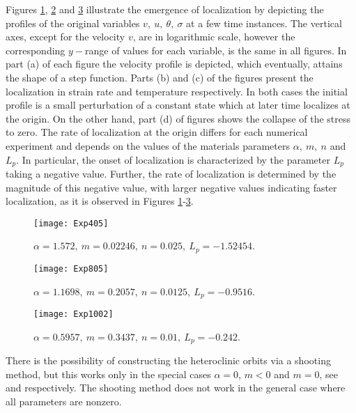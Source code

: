 \documentclass[usletter,11pt]{article}
\theoremstyle{remark}
\begin{document}
Figures \ref{fig_n40}, \ref{fig_n80} and \ref{fig_n100} illustrate the emergence of 
localization by depicting the profiles of the original variables $v,\ u, \ \theta, \ \sigma$ at a few time instances. The vertical axes, except for the velocity $v$, are in logarithmic scale, however the corresponding $y-$range of values for each variable, is the same in all figures.   In part (a) of each figure the velocity profile is depicted,  which eventually, attains the shape of a step function. Parts
(b) and (c) of the figures present the localization in strain rate and temperature respectively. In both cases the initial profile is a small perturbation of a constant state which at later time localizes at the origin. On the other hand, part (d) of figures
shows the collapse of the stress to zero. 
%
The rate of localization at the origin  differs for each numerical experiment and depends on the values of the materials parameters $\alpha, \ m, \ n$ and $L_p$. 
In particular, the onset of localization is characterized by the parameter $L_p$ taking a negative value. Further,  the rate of localization is determined by the magnitude of this negative value, with larger negative values indicating faster localization, as it is observed in Figures \ref{fig_n40}-\ref{fig_n100}. 

\begin{figure}
\centering\texttt{[image: Exp405]} 
\caption{$\alpha=1.572, \ m=0.02246, \ n=0.025, \ L_p = -1.52454$.}
\label{fig_n40}
\end{figure}

\begin{figure}
\texttt{[image: Exp805]} 
\centering\caption{$\alpha=1.1698, \ m=0.2057, \ n=0.0125, \ L_p = -0.9516$.}
\label{fig_n80}
\end{figure}

\begin{figure}
\texttt{[image: Exp1002]} 
\centering\caption{$\alpha=0.5957, \ m=0.3437, \ n=0.01, \ L_p = -0.242$.}
\label{fig_n100}
\end{figure}

There is the possibility of constructing the heteroclinic orbits via a shooting method, but this works only in the special cases $\alpha = 0$, $m <0$ and  $m=0$, see \cite{KLT_2016}
and \cite{KLT_HYP2016} respectively. The shooting method does not work in the general case where all parameters are nonzero.



\appendix
\end{document}
